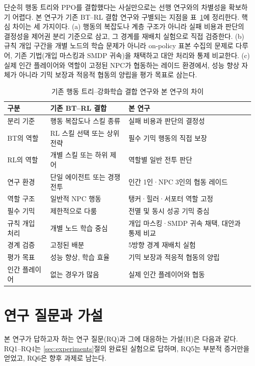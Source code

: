 \documentclass[12pt]{article}      %
\begin{document}
단순히 행동 트리와 PPO를 결합했다는 사실만으로는 선행 연구와의 차별성을 확보하기
어렵다. 본 연구가 기존 BT--RL 결합 연구와 구별되는 지점을
표~\ref{tab:diff}에 정리한다. 핵심 차이는 세 가지이다. (a) 행동의 복잡도나 계층
구조가 아니라 실패 비용과 판단의 결정성을 제어권 분리 기준으로 삼고, 그 경계를
재배치 실험으로 직접 검증한다. (b) 규칙 개입 구간을 개별 노드의 학습 문제가
아니라 on-policy 표본 수집의 문제로 다루어, 기존 기법(개입 마스킹과 SMDP 귀속)을
채택하고 대안 처리와 통제 비교한다. (c) 실제 인간 플레이어와 역할이 고정된
NPC가 협동하는 레이드 환경에서, 성능 향상 자체가 아니라 기믹 보장과 적응적
협동의 양립을 평가 목표로 삼는다.

\begin{table}[t]
\caption{기존 행동 트리--강화학습 결합 연구와 본 연구의 차이}
\label{tab:diff}
\begin{tabularx}{\textwidth}{lXX}
\toprule
구분 & 기존 BT--RL 결합 & 본 연구 \\
\midrule
분리 기준 & 행동 복잡도나 스킬 종류 & 실패 비용과 판단의 결정성 \\
BT의 역할 & RL 스킬 선택 또는 상위 전략 & 필수 기믹 행동의 직접 보장 \\
RL의 역할 & 개별 스킬 또는 하위 제어 & 역할별 일반 전투 판단 \\
연구 환경 & 단일 에이전트 또는 경쟁 전투 & 인간 1인·NPC 3인의 협동 레이드 \\
역할 구조 & 일반적 NPC 행동 & 탱커·힐러·서포터 역할 고정 \\
필수 기믹 & 제한적으로 다룸 & 전멸 및 동시 성공 기믹 중심 \\
규칙 개입 처리 & 개별 노드 학습 중심 & 개입 마스킹·SMDP 귀속 채택, 대안과 통제 비교 \\
경계 검증 & 고정된 배분 & 5방향 경계 재배치 실험 \\
평가 목표 & 성능 향상, 학습 효율 & 기믹 보장과 적응적 협동의 양립 \\
인간 플레이어 & 없는 경우가 많음 & 실제 인간 플레이어와 협동 \\
\bottomrule
\end{tabularx}
\end{table}

\section{연구 질문과 가설}

본 연구가 답하고자 하는 연구 질문(RQ)과 그에 대응하는 가설(H)은 다음과 같다.
RQ1--RQ4는 \ref{sec:experiments}절의 완료된 실험으로 답하며, RQ5는 부분적
증거만을 얻었고, RQ6은 향후 과제로 남는다.
\end{document}
